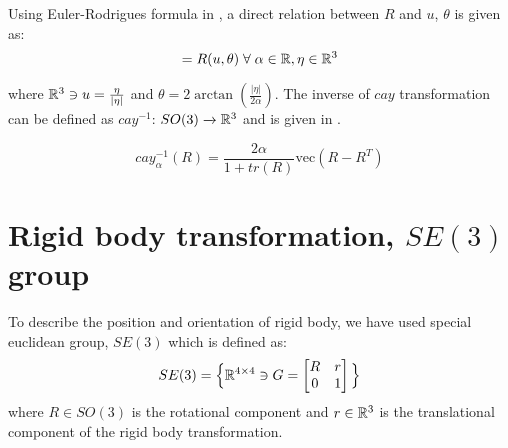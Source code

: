 Using Euler-Rodrigues formula in , a direct relation between $R$ and  $u$, $\theta$ is given as:
\begin{equation}
[0,\pi) \ni \theta = \arccos\left( \frac{tr(R)-1}{2}\right) \;\; \text{and} \;\; \R^{3} \ni u = \frac{2}{1+tr(R)} \text{vec}(R-R^{T})
\label{a3:eq4}    
\end{equation}
Note that, for $\theta = 0 \; \text{and}\; \pi$, the rotation matrix become symmetric which means $R-R^T$ will be a zero-matrix and thus, can't be used for the computation of rotation axis, $u$. In the case of $\theta=0$, $Q$ becomes an identity matrix, and any unit vector can be the rotation axis. However, when $\theta=\pi$, the axis of rotation will be the eigenvector of matrix $Q+I$.  
\section{Parameterisation of rotations in cgDNA$+$ model}\label{a3:s2}
Now, to parameterise rotations in cgDNA$+$ model,
we have used Cayley parameters (details in ~\cite{lankavs2009parameterization,patelithesis,petthesis}). We have defined the function $cay: \R^3 \xrightarrow{} SO(3)$ as: 

\begin{equation}
cay_{\alpha}(\eta) = I + \frac{1}{4\alpha^{2}+|\eta|^{2}} \left[  4\alpha \eta^{\times} + 2(\eta^{\times})^2 \right] = R(u,\theta) \; \forall \; \alpha \in \R, \eta \in \R^{3}
\label{a3:eq5}    
\end{equation}

where ${\mathbb R}^3 \ni u=\frac{\eta}{|\eta|}$ and $\theta=2\arctan{\left(\frac{|\eta|}{2\alpha}\right)}$. 
The inverse of $cay$ transformation can be defined as $cay^{-1}$: $SO(3) \xrightarrow{} {\mathbb R}^3$ and is given in .

\begin{equation}
cay_{\alpha}^{-1}(R) = \frac{2\alpha}{1+tr(R)} \text{vec}(R-R^{T})
\label{a3:eq6}    
\end{equation}

\section{Rigid body transformation, $SE(3)$ group} \label{a3:s3}
To describe the position and orientation of rigid body, we have used 
special euclidean group, $SE(3)$ which is defined as: 
\begin{equation}
SE(3) = \Big\{  {\mathbb R}^{4\times4} \ni G =  
\begin{bmatrix}
    R & r  \\
    0 & 1   \\
   \end{bmatrix} \Big\}
\label{a3:eq7}    
\end{equation}
where $R \in SO(3)$ is the rotational component and $ r \in {\mathbb R}^3$ is the translational component of the rigid body transformation. 

